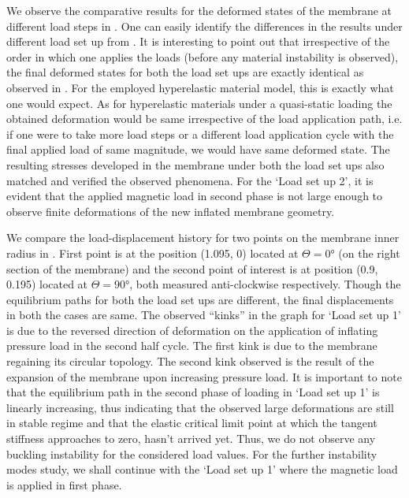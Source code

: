 We observe the comparative results for the deformed states of the membrane at different load steps in . One can easily identify the differences in the results under different load set up from . It is interesting to point out that irrespective of the order in which one applies the loads (before any material instability is observed), the final deformed states for both the load set ups are exactly identical as observed in . For the employed hyperelastic material model, this is exactly what one would expect. As for hyperelastic materials under a quasi-static loading the obtained deformation would be same irrespective of the load application path, i.e. if one were to take more load steps or a different load application cycle with the final applied load of same magnitude, we would have same deformed state. The resulting stresses developed in the membrane under both the load set ups also matched and verified the observed phenomena. For the `Load set up 2', it is evident that the applied magnetic load in second phase is not large enough to observe finite deformations of the new inflated membrane geometry. \par

We compare the load-displacement history for two points on the membrane inner radius in . First point is at the position (1.095, 0) located at $\Theta = \ang{0}$ (on the right section of the membrane) and the second point of interest is at position (0.9, 0.195) located at $\Theta = \ang{90}$, both measured anti-clockwise respectively. Though the equilibrium paths for both the load set ups are different, the final displacements in both the cases are same. The observed ``kinks'' in the graph for `Load set up 1' is due to the reversed direction of deformation on the application of inflating pressure load in the second half cycle. The first kink is due to the membrane regaining its circular topology. The second kink observed is the result of the expansion of the membrane upon increasing pressure load. It is important to note that the equilibrium path in the second phase of loading in `Load set up 1' is linearly increasing, thus indicating that the observed large deformations are still in stable regime and that the elastic critical limit point at which the tangent stiffness approaches to zero, hasn't arrived yet. Thus, we do not observe any buckling instability for the considered load values. For the further instability modes study, we shall continue with the `Load set up 1' where the magnetic load is applied in first phase. \par  

